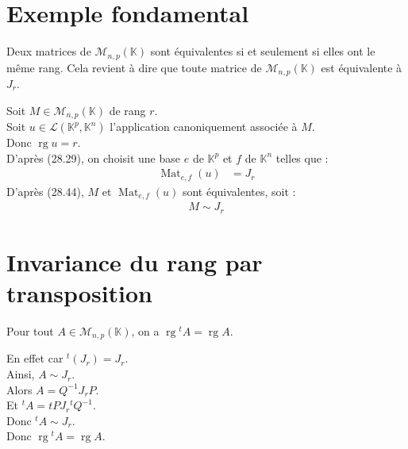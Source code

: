 \documentclass[../main.tex]{subfiles}
\begin{document}
\section{Exemple fondamental}
\begin{tcolorbox}[title=Propostion 28.47, title filled=false, colframe=lightblue, colback=lightblue!10!white]
    Deux matrices de $\mathcal{M}_{n,p}(\mathbb{K})$ sont équivalentes si et seulement si elles ont le même rang. Cela revient à dire que toute matrice de $\mathcal{M}_{n,p}(\mathbb{K})$ est équivalente à $J_r$. 
\end{tcolorbox}

\noindent Soit $M\in \mathcal{M}_{n,p}(\mathbb{K})$ de rang $r$. \\
Soit $u\in \mathcal{L}(\mathbb{K}^p, \mathbb{K}^n)$ l'application canoniquement associée à $M$. \\
Donc $\operatorname{rg} u = r$. \\
D'après (28.29), on choisit une base $e$ de $\mathbb{K}^p$ et $f$ de $\mathbb{K}^n$ telles que :
\begin{align*}
    \operatorname{Mat}_{e,f}(u) &= J_r
\end{align*}
D'après (28.44), $M$ et $\operatorname{Mat}_{e,f}(u)$ sont équivalentes, soit : 
\begin{align*}
    M\sim J_r
\end{align*}

\section{Invariance du rang par transposition}
\begin{tcolorbox}[title=Théorème 28.48, title filled=false, colframe=orange, colback=orange!10!white]
    Pour tout $A\in \mathcal{M}_{n,p}(\mathbb{K})$, on a $\operatorname{rg} {^tA} = \operatorname{rg} A$. 
\end{tcolorbox}

\noindent En effet car $^t(J_r) = J_r$. \\
Ainsi, $A\sim J_r$. \\
Alors $A = Q^{-1}J_r P$. \\
Et $^tA = tP J_r {^tQ^{-1}}$. \\
Donc $^tA\sim J_r$. \\
Donc $\operatorname{rg} {^tA} = \operatorname{rg} A$. 

\end{document}
